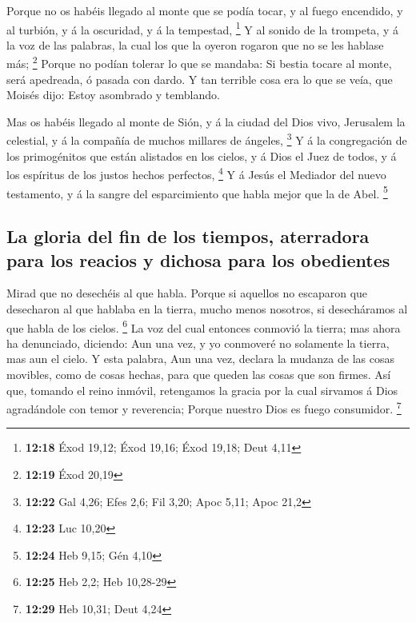  Porque no os habéis llegado al monte que se podía tocar,
y al fuego encendido, y al turbión, y á la oscuridad, y á la tempestad,
\footnote{\textbf{12:18} Éxod 19,12; Éxod 19,16; Éxod 19,18; Deut 4,11}
 Y al sonido de la trompeta, y á la voz de las palabras,
la cual los que la oyeron rogaron que no se les hablase más; \footnote{\textbf{12:19}
  Éxod 20,19}  Porque no podían tolerar lo que se
mandaba: Si bestia tocare al monte, será apedreada, ó pasada con dardo.
 Y tan terrible cosa era lo que se veía, que Moisés dijo:
Estoy asombrado y temblando.

 Mas os habéis llegado al monte de Sión, y á la ciudad
del Dios vivo, Jerusalem la celestial, y á la compañía de muchos
millares de ángeles, \footnote{\textbf{12:22} Gal 4,26; Efes 2,6; Fil
  3,20; Apoc 5,11; Apoc 21,2}  Y á la congregación de los
primogénitos que están alistados en los cielos, y á Dios el Juez de
todos, y á los espíritus de los justos hechos perfectos, \footnote{\textbf{12:23}
  Luc 10,20}  Y á Jesús el Mediador del nuevo testamento,
y á la sangre del esparcimiento que habla mejor que la de Abel.
\footnote{\textbf{12:24} Heb 9,15; Gén 4,10}

\hypertarget{la-gloria-del-fin-de-los-tiempos-aterradora-para-los-reacios-y-dichosa-para-los-obedientes}{%
\subsection{La gloria del fin de los tiempos, aterradora para los
reacios y dichosa para los
obedientes}\label{la-gloria-del-fin-de-los-tiempos-aterradora-para-los-reacios-y-dichosa-para-los-obedientes}}

 Mirad que no desechéis al que habla. Porque si aquellos
no escaparon que desecharon al que hablaba en la tierra, mucho menos
nosotros, si desecháramos al que habla de los cielos. \footnote{\textbf{12:25}
  Heb 2,2; Heb 10,28-29}  La voz del cual entonces
conmovió la tierra; mas ahora ha denunciado, diciendo: Aun una vez, y yo
conmoveré no solamente la tierra, mas aun el cielo.  Y
esta palabra, Aun una vez, declara la mudanza de las cosas movibles,
como de cosas hechas, para que queden las cosas que son firmes.
 Así que, tomando el reino inmóvil, retengamos la gracia
por la cual sirvamos á Dios agradándole con temor y reverencia;
 Porque nuestro Dios es fuego consumidor. \footnote{\textbf{12:29}
  Heb 10,31; Deut 4,24}

